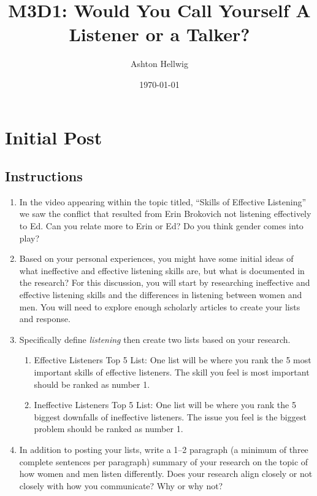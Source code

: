 \documentclass[stu,12pt]{apa7}
\title{%
    M3D1: Would You Call Yourself A Listener or a Talker?
  }
\author{Ashton Hellwig}
\date{\today}
\begin{document}
  \maketitle

  \section{Initial Post}
    \subsection*{Instructions}
      \begin{enumerate}
        \item In the video appearing within the topic titled,
          ``Skills of Effective Listening'' we saw the conflict that resulted
          from Erin Brokovich not listening effectively to Ed. Can you relate
          more to Erin or Ed? Do you think gender comes into play?
        \item Based on your personal experiences, you might have some initial
          ideas of what ineffective and effective listening skills are, but
          what is documented in the research? For this discussion, you will
          start by researching ineffective and effective listening skills and
          the differences in listening between women and men. You will need to
          explore enough scholarly articles to create your lists and response.
        \item Specifically define \textit{listening} then create two lists
          based on your research.
          \begin{enumerate}
            \item Effective Listeners Top 5 List: One list will be where you
              rank the 5 most important skills of effective listeners. The
              skill you feel is most important should be ranked as number 1.
            \item Ineffective Listeners Top 5 List: One list will be where you
              rank the 5 biggest downfalls of ineffective listeners. The issue
              you feel is the biggest problem should be ranked as number 1.
          \end{enumerate}
        \item In addition to posting your lists, write a 1--2 paragraph (a
          minimum of three complete sentences per paragraph) summary of your
          research on the topic of how women and men listen differently. Does
          your research align closely or not closely with how you communicate?
          Why or why not?
      \end{enumerate}
\end{document}
